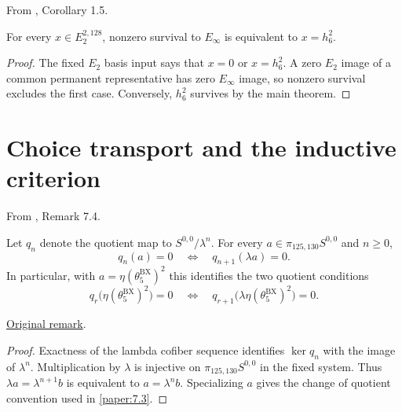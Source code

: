 \begin{theorem}
\label{sem:Main:two-line-stem126}
From \cite{LWX126}, Corollary 1.5.\par
For every $x\in E_2^{2,128}$, nonzero survival to $E_\infty$ is equivalent to $x=h_6^2$.
\end{theorem}
\begin{proof}
The fixed $E_2$ basis input says that $x=0$ or $x=h_6^2$. A zero $E_2$ image of a common permanent representative has zero $E_\infty$ image, so nonzero survival excludes the first case. Conversely, $h_6^2$ survives by the main theorem.
\end{proof}

\section{Choice transport and the inductive criterion}
\begin{remark}
\label{sem:Main:remark-7.4}
From \cite{LWX126}, Remark 7.4.\par
Let $q_n$ denote the quotient map to $S^{0,0}/\lambda^n$. For every $a\in\pi_{125,130}S^{0,0}$ and $n\geq0$,
\[
 q_n(a)=0\quad\Longleftrightarrow\quad q_{n+1}(\lambda a)=0.
\]
In particular, with $a=\eta(\theta_5^{\mathrm{BX}})^2$ this identifies the two quotient conditions
\[
 q_r\bigl(\eta(\theta_5^{\mathrm{BX}})^2\bigr)=0
 \quad\Longleftrightarrow\quad
 q_{r+1}\bigl(\lambda\eta(\theta_5^{\mathrm{BX}})^2\bigr)=0.
\]

\href{paper/main.tex.html#L2127}{Original remark}.
\end{remark}
\begin{proof}
Exactness of the lambda cofiber sequence identifies $\ker q_n$ with the image of $\lambda^n$. Multiplication by $\lambda$ is injective on $\pi_{125,130}S^{0,0}$ in the fixed system. Thus $\lambda a=\lambda^{n+1}b$ is equivalent to $a=\lambda^n b$. Specializing $a$ gives the change of quotient convention used in \ref{paper:7.3}.
\end{proof}

